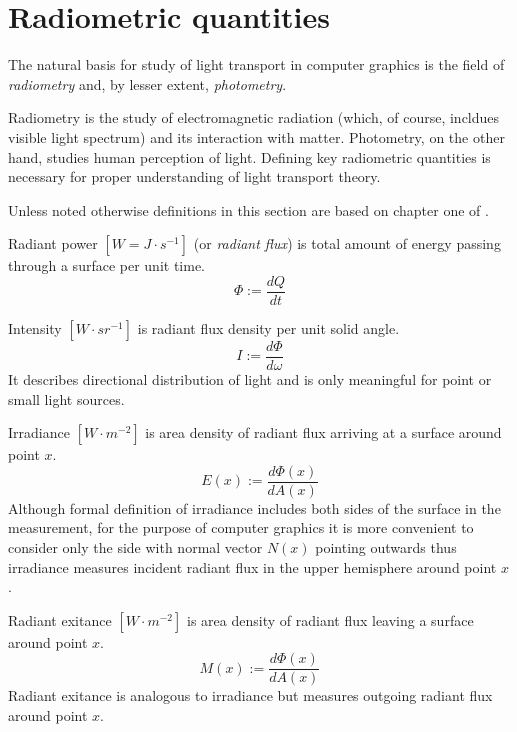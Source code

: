 \section{Radiometric quantities}
The natural basis for study of light transport in computer graphics is the field of \emph{radiometry} and, by lesser extent, \emph{photometry}.

Radiometry is the study of electromagnetic radiation (which, of course, incldues visible light spectrum) and its interaction with matter. Photometry, on the other hand, studies human perception of light. Defining key radiometric quantities is necessary for proper understanding of light transport theory.

Unless noted otherwise definitions in this section are based on chapter one of \cite{mccluney94}.

\begin{df}
Radiant power $[W=J \cdot s^{-1}]$ (or \emph{radiant flux}) is total amount of energy passing through a surface per unit time.
\begin{equation}
  \Phi := \frac{dQ}{dt}
\end{equation}
\end{df}

\begin{df}
Intensity $[W \cdot sr^{-1}]$ is radiant flux density per unit solid angle.
\begin{equation}
  I := \frac{d\Phi}{d\omega}
\end{equation}
It describes directional distribution of light and is only meaningful for point or small light sources.
\end{df}

\begin{df}
Irradiance $[W \cdot m^{-2}]$ is  area density of radiant flux arriving at a surface around point $x$.
\begin{equation}
  E(x) := \frac{d\Phi(x)}{dA(x)}
\end{equation}
Although formal definition of irradiance includes both sides of the surface in the measurement, for the purpose of computer graphics it is more convenient to consider only the side with normal vector $N(x)$ pointing outwards thus irradiance measures incident radiant flux in the upper hemisphere around point $x$.
\end{df}

\begin{df}
Radiant exitance $[W \cdot m^{-2}]$ \parencite{nicodemus78} is area density of radiant flux leaving a surface around point $x$.
\begin{equation}
  M(x) := \frac{d\Phi(x)}{dA(x)}
\end{equation}
Radiant exitance is analogous to irradiance but measures outgoing radiant flux around point $x$.
\end{df}

